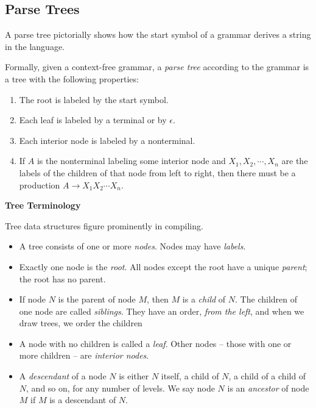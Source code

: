 \documentclass[a4paper,twoside]{book}
\begin{document}
\subsection{Parse Trees}

A parse tree pictorially shows how the start symbol of a grammar derives a string in the language.

Formally, given a context-free grammar, a \textit{parse tree} according to the grammar is a tree with the following properties:
\begin{enumerate}
    \item The root is labeled by the start symbol.
    \item Each leaf is labeled by a terminal or by $\epsilon$.
    \item Each interior node is labeled by a nonterminal.
    \item If $A$ is the nonterminal labeling some interior node and $X_1,X_2,\cdots,X_n$ are the labels of the children of that node from left to right, then there must be a production $A\rightarrow X_1X_2\cdots X_n$.
\end{enumerate}

\begin{framed}
    \begin{center}
        \textbf{{\large Tree Terminology}}
    \end{center}

    Tree data structures figure prominently in compiling.
    \begin{itemize}
        \item A tree consists of one or more \textit{nodes}. Nodes may have \textit{labels}.
        \item Exactly one node is the \textit{root}. All nodes except the root have a unique \textit{parent}; the root has no parent.
        \item If node $N$ is the parent of node $M$, then $M$ is a \textit{child} of $N$. The children of one node are called \textit{siblings}. They have an order, \textit{from the left}, and when we draw trees, we order the children 
        \item A node with no children is called a \textit{leaf}. Other nodes -- those with one or more children -- are \textit{interior nodes}.
        \item A \textit{descendant} of a node $N$ is either $N$ itself, a child of $N$, a child of a child of $N$, and so on, for any number of levels. We say node $N$ is an \textit{ancestor} of node $M$ if $M$ is a descendant of $N$.
    \end{itemize}
\end{framed}
\end{document}
